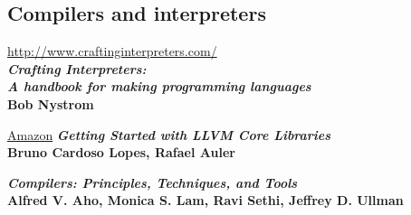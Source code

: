 \begin{thebibliography}{99}
\section*{Compilers and interpreters}

\url{http://www.craftinginterpreters.com/}\\
\emph{\textbf{Crafting Interpreters:\\A handbook for making programming
languages}}\\
\textbf{Bob Nystrom}

\href{https://www.amazon.com/Getting-Started-LLVM-Core-Libraries/dp/1782166920}{Amazon}
\emph{\textbf{Getting Started with LLVM Core Libraries}}\\
\textbf{Bruno Cardoso Lopes, Rafael Auler}

\emph{\textbf{Compilers: Principles, Techniques, and Tools}}\\
\textbf{Alfred V. Aho, Monica S. Lam, Ravi Sethi, Jeffrey D. Ullman }

\end{thebibliography}
